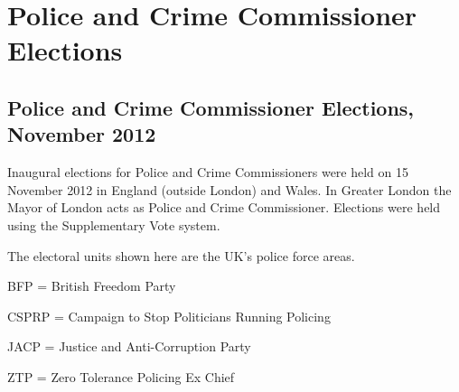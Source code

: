 \documentclass[a4paper,openany]{book}
\begin{document}
 
 


\part{Police and Crime Commissioner Elections}

\chapter{Police and Crime Commissioner Elections, November 2012}

Inaugural elections for Police and Crime Commissioners were held on 15 November 2012 in England (outside London) and Wales.  In Greater London the Mayor of London acts as Police and Crime Commissioner.  Elections were held using the Supplementary Vote system.

The electoral units shown here are the UK's police force areas.

BFP = British Freedom Party

CSPRP = Campaign to Stop Politicians Running Policing

JACP = Justice and Anti-Corruption Party

ZTP = Zero Tolerance Policing Ex Chief
\end{document}
